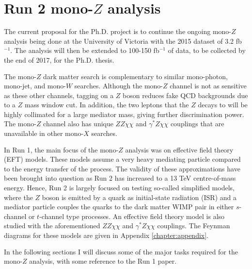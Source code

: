 \section{Run 2 mono-$Z$ analysis}
\label{sec:monoZ}

The current proposal for the Ph.D. project is to continue the ongoing mono-$Z$ analysis being done at the University of Victoria with the 2015 dataset of 3.2 fb$^{-1}$. The analysis will then be extended to 100-150 fb$^{-1}$ of data, to be collected by the end of 2017, for the Ph.D. thesis.

The mono-$Z$ dark matter search is complementary to similar mono-photon, mono-jet, and mono-$W$ searches. Although the mono-$Z$ channel is not as sensitive as these other channels, tagging on a $Z$ boson reduces fake QCD backgrounds due to a $Z$ mass window cut. In addition, the two leptons that the $Z$ decays to will be highly collimated for a large mediator mass, giving further discrimination power. The mono-$Z$ channel also has unique $ZZ\chi\chi$ and $\gamma^*Z\chi\chi$ couplings that are unavailable in other mono-$X$ searches. 

In Run 1, the main focus of the mono-$Z$ analysis was on effective field theory (EFT) models. These models assume a very heavy mediating particle compared to the energy transfer of the process. The validity of these approximations have been brought into question as Run 2 has increased to a 13 TeV centre-of-mass energy. Hence, Run 2 is largely focused on testing so-called simplified models, where the $Z$ boson is emitted by a quark as initial-state radiation (ISR) and a mediator particle couples the quarks to the dark matter WIMP pair in either $s$-channel or $t$-channel type processes. An effective field theory model is also studied with the aforementioned $ZZ\chi\chi$ and $\gamma^*Z\chi\chi$ couplings. The Feynman diagrams for these models are given in Appendix \ref{chapter:appendix}.

In the following sections I will discuss some of the major tasks required for the mono-$Z$ analysis, with some reference to the Run 1 paper.